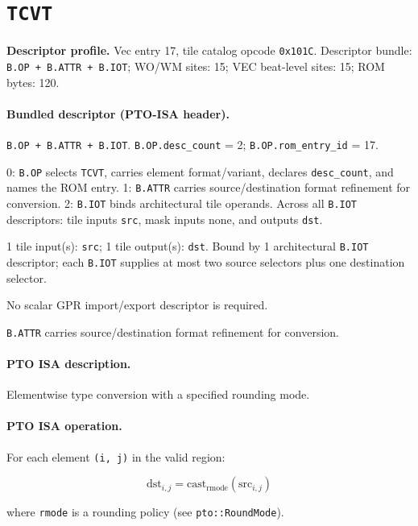 \section{\texttt{TCVT}}
\noindent\textbf{Descriptor profile.} Vec entry 17, tile catalog opcode \texttt{0x101C}. Descriptor bundle: \texttt{B.OP + B.ATTR + B.IOT}; WO/WM sites: 15; VEC beat-level sites: 15; ROM bytes: 120.\par\smallskip
{}
\paragraph{Bundled descriptor (PTO-ISA header).}
\begin{description}[leftmargin=0.18\linewidth,style=nextline]
\item[Bundle] \texttt{B.OP + B.ATTR + B.IOT}. \texttt{B.OP.desc\_count} = 2; \texttt{B.OP.rom\_entry\_id} = 17.
\item[Assembly] 0: \texttt{B.OP} selects \texttt{TCVT}, carries element format/variant, declares \texttt{desc\_count}, and names the ROM entry. 1: \texttt{B.ATTR} carries source/destination format refinement for conversion. 2: \texttt{B.IOT} binds architectural tile operands. Across all \texttt{B.IOT} descriptors: tile inputs \texttt{src}, mask inputs none, and outputs \texttt{dst}.
\item[Tile operands] 1 tile input(s): \texttt{src}; 1 tile output(s): \texttt{dst}. Bound by 1 architectural \texttt{B.IOT} descriptor; each \texttt{B.IOT} supplies at most two source selectors plus one destination selector.
\item[Scalar GPR operands] No scalar GPR import/export descriptor is required.
\item[Metadata operands] \texttt{B.ATTR} carries source/destination format refinement for conversion.
\end{description}
\par\smallskip
{\small
\paragraph{PTO ISA description.}
Elementwise type conversion with a specified rounding mode.
\paragraph{PTO ISA operation.}
For each element \texttt{(i, j)} in the valid region:

\[
\mathrm{dst}_{i,j} = \mathrm{cast}_{\mathrm{rmode}}\!\left(\mathrm{src}_{i,j}\right)
\]

where \texttt{rmode} is a rounding policy (see \texttt{pto::RoundMode}).
}\par\smallskip
